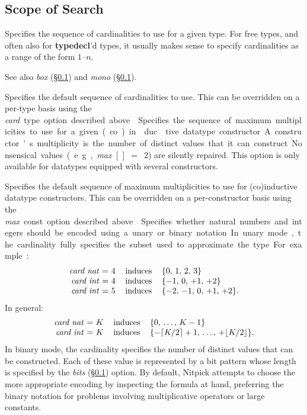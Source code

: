 \documentclass[a4paper,12pt]{article}
\begin{document}
\subsection{Scope of Search}
\label{scope-of-search}

\begin{enum}
Specifies the sequence of cardinalities to use for a given type.
For free types, and often also for \textbf{typedecl}'d types, it usually makes
sense to specify cardinalities as a range of the form \textit{$1$--$n$}.

\nopagebreak
{\small See also \textit{box} (\S\ref{scope-of-search}) and \textit{mono}
(\S\ref{scope-of-search}).}

Specifies the default sequence of cardinalities to use. This can be overridden
on a per-type basis using the \textit{card}~\qty{type} option described above.

Specifies the sequence of maximum multiplicities to use for a given
(co)in\-duc\-tive datatype constructor. A constructor's multiplicity is the
number of distinct values that it can construct. Nonsensical values (e.g.,
\textit{max}~[]~$=$~2) are silently repaired. This option is only available for
datatypes equipped with several constructors.

Specifies the default sequence of maximum multiplicities to use for
(co)in\-duc\-tive datatype constructors. This can be overridden on a per-constructor
basis using the \textit{max}~\qty{const} option described above.

Specifies whether natural numbers and integers should be encoded using a unary
or binary notation. In unary mode, the cardinality fully specifies the subset
used to approximate the type. For example:
%
$$\hbox{\begin{tabular}{@{}rll@{}}%
\textit{card nat} = 4 & induces & $\{0,\, 1,\, 2,\, 3\}$ \\
\textit{card int} = 4 & induces & $\{-1,\, 0,\, +1,\, +2\}$ \\
\textit{card int} = 5 & induces & $\{-2,\, -1,\, 0,\, +1,\, +2\}.$%
\end{tabular}}$$
%
In general:
%
$$\hbox{\begin{tabular}{@{}rll@{}}%
\textit{card nat} = $K$ & induces & $\{0,\, \ldots,\, K - 1\}$ \\
\textit{card int} = $K$ & induces & $\{-\lceil K/2 \rceil + 1,\, \ldots,\, +\lfloor K/2 \rfloor\}.$%
\end{tabular}}$$
%
In binary mode, the cardinality specifies the number of distinct values that can
be constructed. Each of these value is represented by a bit pattern whose length
is specified by the \textit{bits} (\S\ref{scope-of-search}) option. By default,
Nitpick attempts to choose the more appropriate encoding by inspecting the
formula at hand, preferring the binary notation for problems involving
multiplicative operators or large constants.


\end{enum}
\end{document}
